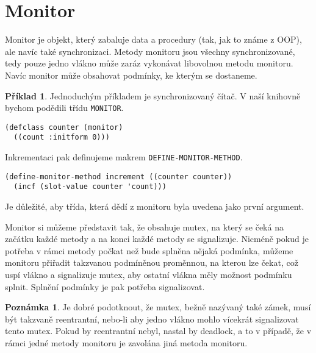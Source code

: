 \documentclass {article}
\theoremstyle {definition}
\newtheorem{example}{Příklad}
\newtheorem*{remark}{Poznámka}
\begin{document}
\section {Monitor}
Monitor je objekt, který zabaluje data a procedury (tak, jak to známe
z OOP), ale navíc také synchronizaci. Metody monitoru jsou všechny
synchronizované, tedy pouze jedno vlákno může zaráz vykonávat
libovolnou metodu monitoru. Navíc monitor může obsahovat podmínky, ke
kterým se dostaneme.

\begin {example}
Jednoduchým příkladem je synchronizovaný čítač. V naší knihovně bychom
podědili třídu \texttt{MONITOR}.

\begin{verbatim}
(defclass counter (monitor)
  ((count :initform 0)))
\end{verbatim}

Inkrementaci pak definujeme makrem \texttt{DEFINE-MONITOR-METHOD}.

\begin{verbatim}
(define-monitor-method increment ((counter counter))
  (incf (slot-value counter 'count)))
\end{verbatim}

Je důležité, aby třída, která dědí z monitoru byla uvedena jako první
argument.
\end {example}

Monitor si můžeme představit tak, že obsahuje mutex, na který se čeká
na začátku každé metody a na konci každé metody se
signalizuje. Nicméně pokud je potřeba v rámci metody počkat než bude
splněna nějaká podmínka, můžeme monitoru přiřadit takzvanou podmíněnou
proměnnou, na kterou lze čekat, což uspí vlákno a signalizuje mutex,
aby ostatní vlákna měly možnost podmínku splnit. Splnění podmínky je
pak potřeba signalizovat.

\begin {remark}
  Je dobré podotknout, že mutex, bežně nazývaný také zámek, musí být
  takzvaně reentrantní, nebo-li aby jedno vlákno mohlo vícekrát
  signalizovat tento mutex. Pokud by reentrantní nebyl, nastal by
  deadlock, a to v případě, že v rámci jedné metody monitoru je zavolána jiná
  metoda monitoru.
\end {remark}
\end{document}
